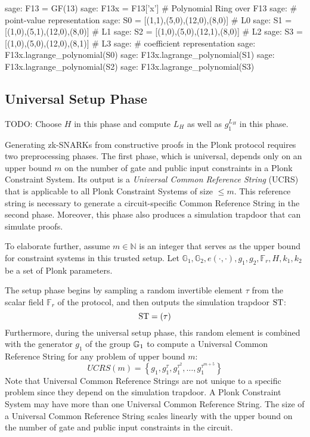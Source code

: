 \begin{example}
\begin{sagecommandline}
sage: F13 = GF(13)
sage: F13x = F13['x'] # Polynomial Ring over F13
sage: # point-value representation
sage: S0 = [(1,1),(5,0),(12,0),(8,0)] # L0
sage: S1 = [(1,0),(5,1),(12,0),(8,0)] # L1
sage: S2 = [(1,0),(5,0),(12,1),(8,0)] # L2
sage: S3 = [(1,0),(5,0),(12,0),(8,1)] # L3
sage: # coefficient representation
sage: F13x.lagrange_polynomial(S0)
sage: F13x.lagrange_polynomial(S1)
sage: F13x.lagrange_polynomial(S2)
sage: F13x.lagrange_polynomial(S3)
\end{sagecommandline}
\end{example}


\subsection{Universal Setup Phase}
TODO: Choose $H$ in this phase and compute $L_H$ as well as $g_1^{L_H}$ in this phase.


Generating zk-SNARKs from constructive proofs in the Plonk protocol requires two preprocessing phases. The first phase, which is universal, depends only on an upper bound $m$ on the number of gate and public input constraints in a Plonk Constraint System. Its output is a \textit{Universal Common Reference String} (UCRS) that is applicable to all Plonk Constraint Systems of size $\leq m$. This reference string is necessary to generate a circuit-specific Common Reference String in the second phase. Moreover, this phase also produces a simulation trapdoor that can simulate proofs.

To elaborate further, assume $m \in \mathbb{N}$ is an integer that serves as the upper bound for constraint systems in this trusted setup. Let ${\mathbb{G}_1, \mathbb{G}_2, e(\cdot,\cdot), g_1, g_2, \mathbb{F}_r, H, k_1,k_2}$ be a set of Plonk parameters.

The setup phase begins by sampling a random invertible element $\tau$ from the scalar field $\mathbb{F}_r$ of the protocol, and then outputs the simulation trapdoor $\mathbf{\mathrm{ST}}$:
\begin{equation}
\label{def:groth16-trapdoor}
\mathrm{ST} = (\tau)
\end{equation}
Furthermore, during the universal setup phase, this random element is combined with the generator $g_1$ of the group $\mathbb{G}_1$ to compute a Universal Common Reference String for any problem of upper bound $m$:
\begin{equation}
\label{def:plonk-ucrs}
UCRS(m) = \left\{g_1, g_1^{\tau}, g_1^{\tau^2},\ldots, g_1^{\tau^{m+5}}\right\}
\end{equation}
Note that Universal Common Reference Strings are not unique to a specific problem since they depend on the simulation trapdoor. A Plonk Constraint System may have more than one Universal Common Reference String. The size of a Universal Common Reference String scales linearly with the upper bound on the number of gate and public input constraints in the circuit.

